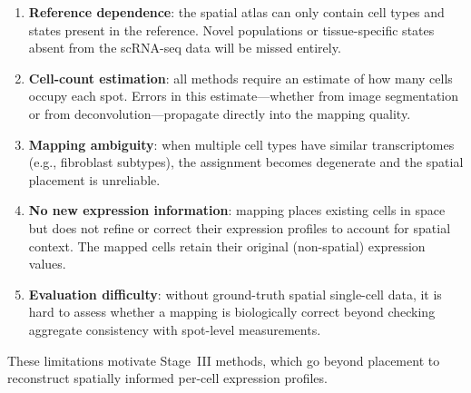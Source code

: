 \begin{enumerate}
  \item \textbf{Reference dependence}: the spatial atlas can only contain cell types and states present in the reference. Novel populations or tissue-specific states absent from the scRNA-seq data will be missed entirely.
  \item \textbf{Cell-count estimation}: all methods require an estimate of how many cells occupy each spot. Errors in this estimate---whether from image segmentation or from deconvolution---propagate directly into the mapping quality.
  \item \textbf{Mapping ambiguity}: when multiple cell types have similar transcriptomes (e.g., fibroblast subtypes), the assignment becomes degenerate and the spatial placement is unreliable.
  \item \textbf{No new expression information}: mapping places existing cells in space but does not refine or correct their expression profiles to account for spatial context. The mapped cells retain their original (non-spatial) expression values.
  \item \textbf{Evaluation difficulty}: without ground-truth spatial single-cell data, it is hard to assess whether a mapping is biologically correct beyond checking aggregate consistency with spot-level measurements.
\end{enumerate}

These limitations motivate Stage~III methods, which go beyond placement to reconstruct spatially informed per-cell expression profiles.
